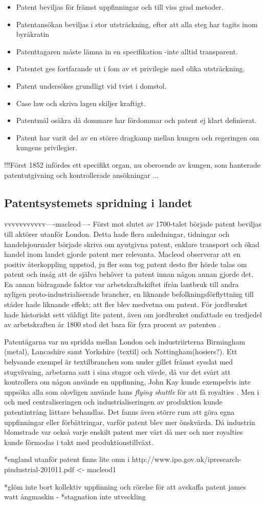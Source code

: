 \begin{itemize}
	\item Patent beviljas för främst uppfinningar och till viss grad metoder.
	\item Patentansökan beviljas i stor utsträckning, efter att alla steg har tagits inom byråkratin
	\item Patenttagaren måste lämna in en specifikation -inte alltid transparent.
	\item Patentet ges fortfarande ut i fom av et privilegie med olika utsträckning.
	\item Patent undersökes grundligt vid tvist i domstol.
	\item Case law och skriva lagen skiljer kraftigt.
	\item Patentmål osäkra då dommare har fördommar och patent ej klart definierat.
	\item Patent har varit del av en större dragkamp mellan kungen och regeringen om kungens privilegier. 
\end{itemize}

!!!Först 1852 infördes ett specifikt organ, nu oberoende av kungen, som hanterade patentutgivning och kontrollerade ansökningar ...


\subsection{Patentsystemets spridning i landet}
\label{sub:patentsystemets_spridning_i_landet}

vvvvvvvvvvv----macleod----
Först mot slutet av 1700-talet började patent beviljas till aktörer utanför London. Detta hade flera
anledningar, tidningar och handelsjournaler började skriva om nyutgivna patent, enklare transport och
ökad handel inom landet gjorde patent mer relevanta\cite{macleod}. Macleod observerar att en positiv återkoppling uppstod, ju fler som tog
patent desto fler hörde talas om patent och insåg att de själva behöver ta patent innan någon annan gjorde
det. En annan bidragande faktor var arbetskraftskiftet ifrån lantbruk till andra nyligen
proto-industrialiserade brancher, en liknande befolkningsförflyttning till städer hade liknande effekt;
att fler blev medvetna om patent\cite{macleod}. För jordbruket hade historiskt sett väldigt lite patent, även om
jordbruket omfattade en tredjedel av arbetskraften år 1800 stod det bara för fyra procent av patenten
\cite{macleod2}.

Patentägarna var nu spridda mellan London och industriirterna Birmingham (metal), Lancashire samt
Yorkshire (textil) och Nottingham(hosiers?). Ett belysande exempel är textilbranchen som under gillet
främst sysslat med stugvävning, arbetarna satt i sina stugor och vävde, då var det svårt att
kontrollera om någon använde en uppfinning, John Kay kunde exempelvis inte uppsöka alla som olovligen
använde hans \emph{flying shuttle} för att få royalties \cite{macleod}. Men i och med centraliseringen och industrialiseringen av produktion kunde patentintrång lättare behandlas. Det fanns även större rum att göra
egna uppfinningar eller förbättringar, varför patent blev mer önskvärda. Då industrin blomstrade var
också varje enskilt patent mer värt då mer och mer royalties kunde förmodas i takt med
produktionstillväxt.


*england utanför patent finns lite omn i http://www.ipo.gov.uk/ipresearch-pindustrial-201011.pdf <- macleod1


*glöm inte bort kollektiv uppfinning och rörelse för att avskaffa patent james watt ångmaskin -
*stagnation inte utveckling


